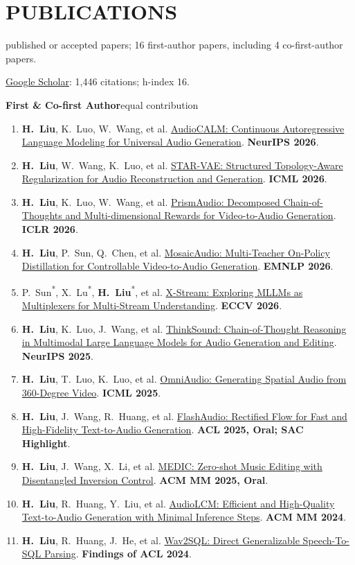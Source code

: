 \documentclass[10pt,letterpaper]{article}
\newcommand{\me}{\textbf{H.\ Liu}}
\newcommand{\eq}{\textsuperscript{*}}
\newcommand{\pub}[4]{\item #1. \href{#4}{\textcolor{ink}{#2}}. {\color{navy}\textbf{#3}}.}
\begin{document}
\section{PUBLICATIONS}
{\fontsize{10}{12} published or accepted papers; 16 first-author papers, including 4 co-first-author papers.\par
\href{https://scholar.google.com/citations?user=-avcK5sAAAAJ}{Google Scholar}: 1,446 citations; h-index 16.\par}
\vspace{4pt}
\textbf{First \& Co-first Author}\hfill {\color{muted}\fontsize{9}{11}\selectfont * equal contribution}\par
\begingroup\fontsize{10}{11.8}\selectfont{}
\begin{enumerate}[itemsep=1.5pt]
\pub{\me, K.\ Luo, W.\ Wang, et al}{AudioCALM: Continuous Autoregressive Language Modeling for Universal Audio Generation}{NeurIPS 2026}{https://arxiv.org/abs/2606.23080}
\pub{\me, W.\ Wang, K.\ Luo, et al}{STAR-VAE: Structured Topology-Aware Regularization for Audio Reconstruction and Generation}{ICML 2026}{https://arxiv.org/abs/2606.23064}
\pub{\me, K.\ Luo, W.\ Wang, et al}{PrismAudio: Decomposed Chain-of-Thoughts and Multi-dimensional Rewards for Video-to-Audio Generation}{ICLR 2026}{https://arxiv.org/abs/2511.18833}
\pub{\me, P.\ Sun, Q.\ Chen, et al}{MosaicAudio: Multi-Teacher On-Policy Distillation for Controllable Video-to-Audio Generation}{EMNLP 2026}{https://openreview.net/forum?id=cEsbadnnl2}
\pub{P.\ Sun\eq, X.\ Lu\eq, \me\eq, et al}{X-Stream: Exploring MLLMs as Multiplexers for Multi-Stream Understanding}{ECCV 2026}{https://arxiv.org/abs/2606.02482}
\pub{\me, K.\ Luo, J.\ Wang, et al}{ThinkSound: Chain-of-Thought Reasoning in Multimodal Large Language Models for Audio Generation and Editing}{NeurIPS 2025}{https://arxiv.org/abs/2506.21448}
\pub{\me, T.\ Luo, K.\ Luo, et al}{OmniAudio: Generating Spatial Audio from 360-Degree Video}{ICML 2025}{https://arxiv.org/abs/2504.14906}
\pub{\me, J.\ Wang, R.\ Huang, et al}{FlashAudio: Rectified Flow for Fast and High-Fidelity Text-to-Audio Generation}{ACL 2025, Oral; SAC Highlight}{https://aclanthology.org/2025.acl-long.673/}
\pub{\me, J.\ Wang, X.\ Li, et al}{MEDIC: Zero-shot Music Editing with Disentangled Inversion Control}{ACM MM 2025, Oral}{https://arxiv.org/abs/2407.13220}
\pub{\me, R.\ Huang, Y.\ Liu, et al}{AudioLCM: Efficient and High-Quality Text-to-Audio Generation with Minimal Inference Steps}{ACM MM 2024}{https://arxiv.org/abs/2406.00356}
\pub{\me, R.\ Huang, J.\ He, et al}{Wav2SQL: Direct Generalizable Speech-To-SQL Parsing}{Findings of ACL 2024}{https://aclanthology.org/2024.findings-acl.251/}

\end{enumerate}
\end{document}
